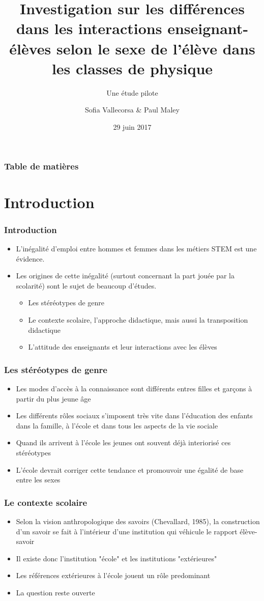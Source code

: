 \documentclass{beamer}
\title{Investigation sur les différences dans les interactions
  enseignant-élèves selon le sexe de l’élève dans les classes
  de physique}
\subtitle{Une étude pilote }
\author{Sofia Vallecorsa \& Paul Maley}
\date{29 juin 2017}
\begin{document}
\frame{\titlepage}

\begin{frame}
\frametitle{Table de matières}
\tableofcontents
\end{frame}

\section{Introduction}
\begin{frame}
\frametitle{Introduction}
\begin{itemize}
\item L'inégalité d'emploi entre hommes et femmes dans les métiers STEM est
  une évidence.
\item Les origines de cette inégalité (surtout concernant la part jouée par
  la scolarité) sont le sujet de beaucoup d'études.
	\begin{itemize}
	\item Les stéréotypes de genre
	\item Le contexte scolaire, l'approche didactique, mais aussi
          la transposition didactique
	\item L'attitude des enseignants et leur interactions avec les élèves	
	\end{itemize}		 
\end{itemize}
\end{frame}

\begin{frame}
\frametitle{Les stéréotypes de genre}
\begin{itemize}
\item Les modes d’accès à la connaissance sont différents entres filles et
  garçons à partir du plus jeune âge
\item Les différents rôles sociaux s’imposent très vite dans l’éducation
  des enfants dans la famille, à l’école et dans tous les aspects de la vie
  sociale
\item Quand ils arrivent à l'école les jeunes ont souvent déjà interiorisé
  ces stéréotypes
\item L’école devrait corriger cette tendance et promouvoir une égalité de
  base entre les sexes
\end{itemize}
\end{frame}

\begin{frame}
\frametitle{Le contexte scolaire}
\begin{itemize}
\item Selon la vision anthropologique des savoirs (Chevallard, 1985),
  la construction d’un savoir se fait à l’intérieur d’une institution qui
  véhicule le rapport élève-savoir
\item Il existe donc l'institution "école" et les institutions "extérieures"
\item Les références extérieures à l'école jouent un rôle predominant
\item La question reste ouverte
\end{itemize}
\end{frame}
\end{document}

